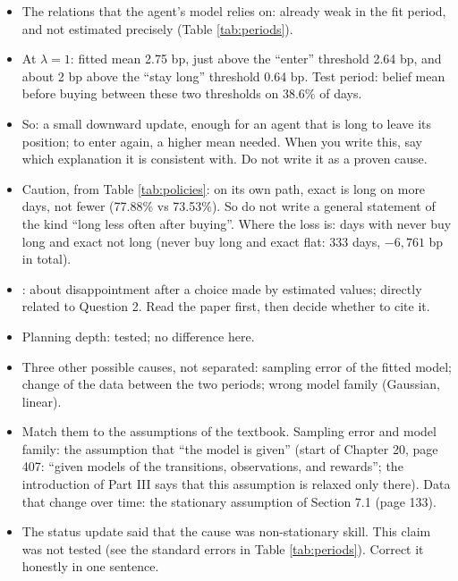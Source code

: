 \documentclass{article}
\newenvironment{pts}{\begin{itemize}[nosep,leftmargin=1.15em,topsep=1pt]}{\end{itemize}}
\begin{document}
\begin{note}
\begin{pts}
\item The relations that the agent's model relies on: already weak in the fit period, and not estimated precisely (Table \ref{tab:periods}).
\item At $\lambda=1$: fitted mean 2.75 bp, just above the ``enter'' threshold 2.64 bp, and about 2 bp above the ``stay long'' threshold 0.64 bp. Test period: belief mean before buying between these two thresholds on 38.6\% of days.
\item So: a small downward update, enough for an agent that is long to leave its position; to enter again, a higher mean needed. When you write this, say which explanation it is consistent with. Do not write it as a proven cause.
\item Caution, from Table \ref{tab:policies}: on its own path, exact is long on more days, not fewer (77.88\% vs 73.53\%). So do not write a general statement of the kind ``long less often after buying''. Where the loss is: days with never buy long and exact not long (never buy long and exact flat: 333 days, $-6{,}761$ bp in total).
\item \citet{smith2006optimizer}: about disappointment after a choice made by estimated values; directly related to Question 2. Read the paper first, then decide whether to cite it.
\end{pts}
\end{note}

\begin{note}
\begin{pts}
\item Planning depth: tested; no difference here.
\item Three other possible causes, not separated: sampling error of the fitted model; change of the data between the two periods; wrong model family (Gaussian, linear).
\item Match them to the assumptions of the textbook. Sampling error and model family: the assumption that ``the model is given'' (start of Chapter 20, page 407: ``given models of the transitions, observations, and rewards''; the introduction of Part III says that this assumption is relaxed only there). Data that change over time: the stationary assumption of Section 7.1 (page 133).
\item The status update said that the cause was non-stationary skill. This claim was not tested (see the standard errors in Table \ref{tab:periods}). Correct it honestly in one sentence.
\end{pts}
\end{note}
\end{document}
